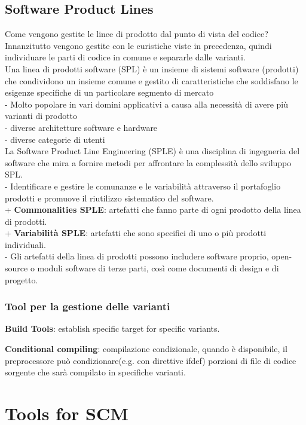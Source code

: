 \documentclass[10pt,a4paper]{book}
\begin{document}
\subsection{Software Product Lines}
Come vengono gestite le linee di prodotto dal punto di vista del codice?
Innanzitutto vengono gestite con le euristiche viste in precedenza, quindi individuare le parti di codice in comune e separarle dalle varianti.\\
Una linea di prodotti software (SPL) è un insieme di sistemi software (prodotti) che condividono un insieme comune e gestito di caratteristiche che soddisfano le esigenze specifiche di un particolare segmento di mercato\\
- Molto popolare in vari domini applicativi a causa alla necessità di avere più varianti di prodotto\\
- diverse architetture software e hardware\\
- diverse categorie di utenti\\

La Software Product Line Engineering (SPLE) è una disciplina di ingegneria del software che mira a fornire metodi per affrontare la complessità dello sviluppo SPL. \\
- Identificare e gestire le comunanze e le variabilità attraverso il portafoglio prodotti e promuove il riutilizzo sistematico del software. \\
+ \textbf{Commonalities SPLE}: artefatti che fanno parte di ogni prodotto della linea di prodotti.\\
+ \textbf{Variabilità SPLE}: artefatti che sono specifici di uno o più prodotti individuali. \\
- Gli artefatti della linea di prodotti possono includere software proprio, open-source o moduli software di terze parti, così come documenti di design e di progetto. \\

\subsubsection{Tool per la gestione delle varianti}
\textbf{Build Tools}: establish specific target for specific variants.

\textbf{Conditional compiling}: compilazione condizionale, quando è disponibile, il preprocessore può condizionare(e.g. con direttive ifdef) porzioni di file di codice sorgente che sarà compilato in specifiche varianti.

\section{Tools for SCM}
\end{document}
